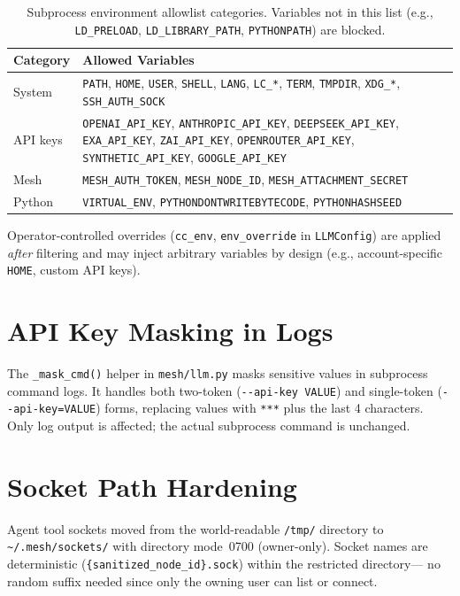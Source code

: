 \documentclass[11pt,letterpaper]{report}
\newcommand{\code}[1]{\texttt{#1}}
\begin{document}
\begin{table}[h]
\centering
\small
\begin{tabular}{@{}lL{8cm}@{}}
\toprule
\textbf{Category} & \textbf{Allowed Variables} \\
\midrule
System     & \code{PATH}, \code{HOME}, \code{USER}, \code{SHELL},
             \code{LANG}, \code{LC\_*}, \code{TERM}, \code{TMPDIR},
             \code{XDG\_*}, \code{SSH\_AUTH\_SOCK} \\
API keys   & \code{OPENAI\_API\_KEY}, \code{ANTHROPIC\_API\_KEY},
             \code{DEEPSEEK\_API\_KEY}, \code{EXA\_API\_KEY},
             \code{ZAI\_API\_KEY}, \code{OPENROUTER\_API\_KEY},
             \code{SYNTHETIC\_API\_KEY}, \code{GOOGLE\_API\_KEY} \\
Mesh       & \code{MESH\_AUTH\_TOKEN}, \code{MESH\_NODE\_ID},
             \code{MESH\_ATTACHMENT\_SECRET} \\
Python     & \code{VIRTUAL\_ENV}, \code{PYTHONDONTWRITEBYTECODE},
             \code{PYTHONHASHSEED} \\
\bottomrule
\end{tabular}
\caption{Subprocess environment allowlist categories. Variables not in this
list (e.g., \code{LD\_PRELOAD}, \code{LD\_LIBRARY\_PATH},
\code{PYTHONPATH}) are blocked.}
\label{tab:env-allowlist}
\end{table}

\noindent
Operator-controlled overrides (\code{cc\_env}, \code{env\_override} in
\code{LLMConfig}) are applied \emph{after} filtering and may inject
arbitrary variables by design (e.g., account-specific \code{HOME},
custom API keys).

\section{API Key Masking in Logs}

The \code{\_mask\_cmd()} helper in \code{mesh/llm.py} masks sensitive
values in subprocess command logs. It handles both two-token
(\code{-{}-api-key VALUE}) and single-token (\code{-{}-api-key=VALUE})
forms, replacing values with \code{***} plus the last 4 characters.
Only log output is affected; the actual subprocess command is unchanged.

\section{Socket Path Hardening}

Agent tool sockets moved from the world-readable \code{/tmp/} directory
to \code{\textasciitilde/.mesh/sockets/} with directory mode~0700
(owner-only). Socket names are deterministic
(\code{\{sanitized\_node\_id\}.sock}) within the restricted directory---
no random suffix needed since only the owning user can list or connect.
\end{document}
